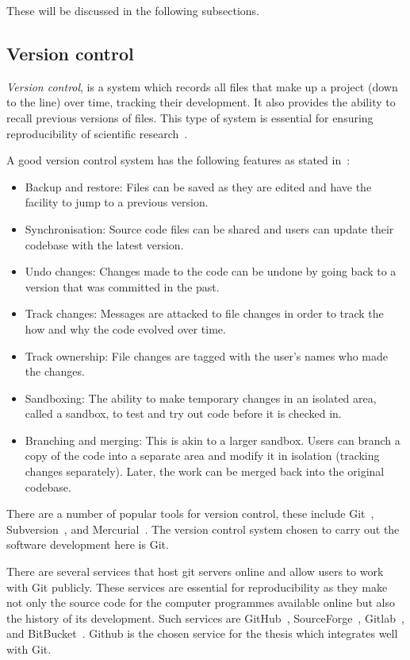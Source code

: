 These will be discussed in the following subsections.

\subsection{Version control}

\textit{Version control}, is a system which records all files that make up a
project (down to the line) over time, tracking their development. It also
provides the ability to recall previous versions of files. This type of system
is essential for ensuring reproducibility of scientific research~\cite{Sandve2013,
Wilson2014}.

A good version control system has the following features as stated in~\cite{Ruparelia2010}:

\begin{itemize}
    \item Backup and restore: Files can be saved as they are edited and have the facility to
    jump to a previous version.
    \item Synchronisation: Source code files can be shared and users can update their
    codebase with the latest version.
    \item Undo changes: Changes made to the code can be undone by going back
    to a version that was committed in the past.
    \item Track changes: Messages are attacked to file changes in order to track the
    how and why the code evolved over time.
    \item Track ownership: File changes are tagged with the user's names who made
    the changes.
    \item Sandboxing: The ability to make temporary changes in an isolated area,
    called a sandbox, to test and try out code before it is checked in.
    \item Branching and merging: This is akin to a larger sandbox. Users can
    branch a copy of the code into a separate area and modify it in
    isolation (tracking changes separately). Later, the work can be merged back
    into the original codebase.
\end{itemize}

There are a number of popular tools for version control, these include Git~\cite{git},
Subversion~\cite{subversion}, and Mercurial~\cite{mercurial}. The version
control system chosen to carry out the software development here is Git.

There are several services that host git servers online and allow users to work
with Git publicly. These services are essential for reproducibility as they make
not only the source code for the computer programmes available online but also
the history of its development. Such services are GitHub~\cite{github},
SourceForge~\cite{sourceforge}, Gitlab~\cite{gitlab}, and BitBucket~\cite{bitbucket}.
Github is the chosen service for the thesis which integrates well with Git.

